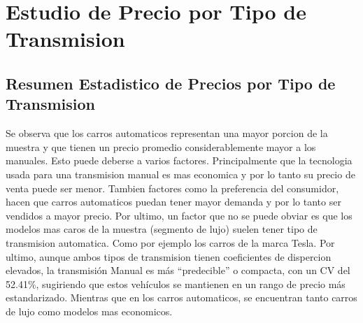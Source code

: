 \documentclass[oneside,11pt]{Latex/Classes/PhDthesisPSnPDF}
\begin{document}
\section {Estudio de Precio por Tipo de Transmision}

\subsection {Resumen Estadistico de Precios por Tipo de Transmision}
\begin{table}[!h]
\centering
\caption{\label{tab:unnamed-chunk-16}Análisis de Precios por Tipo de Transmision}
\centering
{}
\end{table}

Se observa que los carros automaticos representan una mayor porcion de
la muestra y que tienen un precio promedio considerablemente mayor a los
manuales. Esto puede deberse a varios factores. Principalmente que la
tecnologia usada para una transmision manual es mas economica y por lo
tanto su precio de venta puede ser menor. Tambien factores como la
preferencia del consumidor, hacen que carros automaticos puedan tener
mayor demanda y por lo tanto ser vendidos a mayor precio. Por ultimo, un
factor que no se puede obviar es que los modelos mas caros de la muestra
(segmento de lujo) suelen tener tipo de transmision automatica. Como por
ejemplo los carros de la marca Tesla. \newline \newline Por ultimo,
aunque ambos tipos de transmision tienen coeficientes de dispercion
elevados, la transmisión Manual es más ``predecible'' o compacta, con un
CV del 52.41\%, sugiriendo que estos vehículos se mantienen en un rango
de precio más estandarizado. Mientras que en los carros automaticos, se
encuentran tanto carros de lujo como modelos mas economicos.
\end{document}
